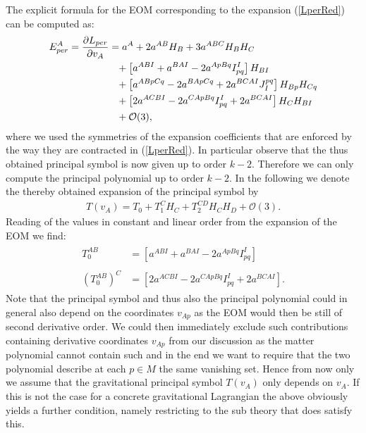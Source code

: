 \documentclass[a4paper,12pt, DIV=14, BCOR=5mm, twoside, headsepline]{scrbook}
\begin{document}
The explicit formula for the EOM corresponding to the expansion (\ref{LperRed}) can be computed as:
\begin{align}\label{EOMPert}
    \begin{aligned}
    E_{per}^A = \frac{\partial L_{per}}{\partial v_A} &= a^A + 2 a^{AB}H_B + 3a^{ABC}H_B H_C \\
    &\hphantom{=}+ \left [a^{ABI} + a^{BAI} - 2 a^{ApBq}I_{pq}^I  \right ] H_{BI} \\
    &\hphantom{=}+ \left[a^{ABpCq} -2a^{BApCq} +2a^{BCAI} J_I^{pq} \right]H_{Bp}H_{Cq} \\
    &\hphantom{=}+ \left [2a^{ACBI} -2a^{CApBq}I_{pq}^I + 2a^{BCAI} \right ]H_C H_{BI} \\
    &\hphantom{=}+ \mathcal{O}(3),
    \end{aligned}
\end{align}
where we used the symmetries of the expansion coefficients that are enforced by the way they are contracted in (\ref{LperRed}).
In particular observe that the thus obtained principal symbol is now given up to order $k-2$. Therefore we can only compute the principal polynomial up to order $k-2$. In the following we denote the thereby obtained expansion of the principal symbol by 
\begin{align}
    T(v_A) = T_0 + T_1^CH_C + T_2^{CD}H_CH_D + \mathcal{O}(3).
\end{align}
Reading of the values in constant and linear order from the expansion of the EOM we find:
\begin{align}
    \begin{aligned}
    T_0^{AB} &= \left [a^{ABI} + a^{BAI} - 2 a^{ApBq}I_{pq}^I  \right ]\\
    \\
    (T_0^{AB})^C &= \left [2a^{ACBI} -2a^{CApBq}I_{pq}^I + 2a^{BCAI} \right ]. 
    \end{aligned}
\end{align}
Note that the principal symbol and thus also the principal polynomial could in general also depend on the coordinates $v_{Ap}$ as the EOM would then be still of second derivative order. We could then immediately exclude such contributions containing derivative coordinates $v_{Ap}$ from our discussion as the matter polynomial cannot contain such and in the end we want to require that the two polynomial describe at each $p \in M$ the same vanishing set. Hence from now only we assume that the gravitational principal symbol $T(v_A)$ only depends on $v_A$. If this is not the case for a concrete gravitational Lagrangian the above obviously yields a further condition, namely restricting to the sub theory that does satisfy this.  \\
\end{document}
